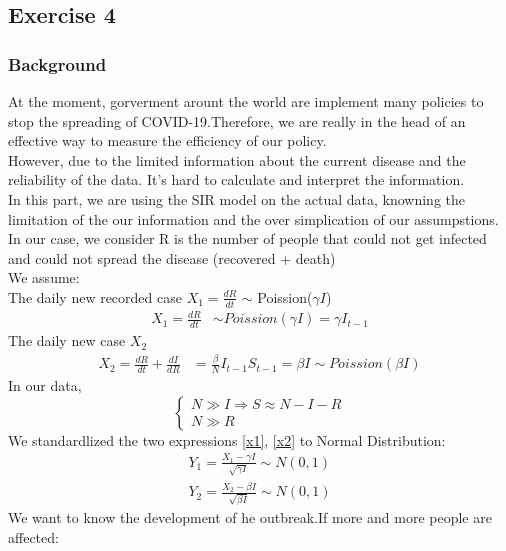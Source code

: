 \documentclass[a4paper]{article}
\begin{document}
    \subsection{Exercise 4}
    \subsubsection{Background}
    At the moment, gorverment arount the world are implement many policies to stop the spreading of COVID-19.Therefore, we are really in the head of an effective way to measure the efficiency of our policy.\\
    However, due to the limited information about the current disease and the reliability of the data. It's hard to calculate and interpret the information.\\
    In this part, we are using the SIR model on the actual data, knowning the limitation of the our information and the over simplication of our assumpstions.\\
    In our case, we consider R is the number of people that could not get infected and could not spread the disease (recovered + death) \\
    We assume: \\
    The daily new recorded case $ X_1 = \frac{dR}{dt}$ $\sim$ Poission($\gamma I $)
    \begin{align} \label{x1}
        X_1 = \frac{dR}{dt} &\sim Poission(\gamma I ) = \gamma I_{t-1}
    \end{align}
    The daily new case $X_2$
    \begin{align} \label{x2}
        X_2 = \frac{dR}{dt} + \frac{dI}{dR} &= \frac{\beta}{N} I_{t-1} S_{t-1} = \beta I \sim Poission(\beta I)
    \end{align}
    In our data,
    \[
        \left\{
                \begin{array}{ll}
                  N \gg I \Rightarrow S \approx N-I-R\\
                  N \gg R
                \end{array}
              \right.
    \]
    We standardlized the two expressions \eqref{x1}, \eqref{x2} to Normal Distribution:
    \begin{align}
        Y_1 = \frac{X_1 - \gamma I}{\sqrt{\gamma I}} \sim N(0,1) \label{y1} \\
        Y_2 = \frac{X_2 - \beta I}{\sqrt{\beta I}} \sim N(0,1) \label{y2}
    \end{align}
    We want to know the development of he outbreak.If more and more people are affected:
\end{document}
